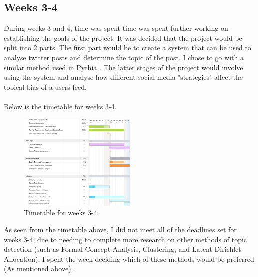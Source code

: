 \subsection{Weeks 3-4}
During weeks 3 and 4, time was spent time was spent further working on establishing the goals of the project. It was
decided that the project would be split into 2 parts. The first part would be to create a system that can be used to
analyse twitter posts and determine the topic of the post. I chose to go with a similar method used in Pythia \cite{Pythia}.
The latter stages of the project would involve using the system and analyse how different social media "strategies" affect
the topical bias of a users feed.\\\\

Below is the timetable for weeks 3-4.

\begin{figure}[htbp]
    \centering
    \includegraphics[width=0.5\textwidth]{../images/timetableweek3-4.png}
    \caption{Timetable for weeks 3-4}
    \label{fig:timetableweek3-4}
\end{figure}

As seen from the timetable above, I did not meet all of the deadlines set for weeks 3-4; due to needing to complete more
research on other methods of topic detection (such as Formal Concept Analysis, Clustering, and Latent Dirichlet Allocation),
I spent the week deciding which of these methods would be preferred (As mentioned above).


